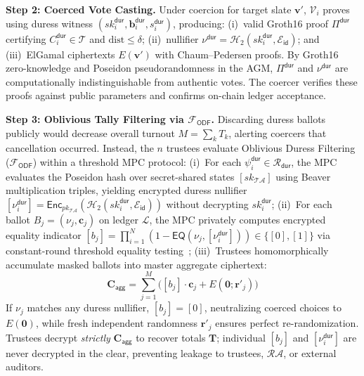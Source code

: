 \documentclass[10pt,letterpaper,journal]{IEEEtran}
\begin{document}
\textbf{Step 2: Coerced Vote Casting.} Under coercion for target slate $\mathbf{v}'$, $\mathcal{V}_i$ proves using duress witness $(sk_i^{\mathsf{dur}}, \mathbf{b}_i^{\mathsf{dur}}, s_i^{\mathsf{dur}})$, producing: (i)~valid Groth16 proof $\Pi^{\mathsf{dur}}$ certifying $C_i^{\mathsf{dur}} \in \mathcal{T}$ and $\mathrm{dist} \le \delta$; (ii)~nullifier $\nu^{\mathsf{dur}} = \mathcal{H}_2(sk_i^{\mathsf{dur}}, \mathcal{E}_{\mathsf{id}})$; and (iii)~ElGamal ciphertexts $E(\mathbf{v}')$ with Chaum--Pedersen proofs. By Groth16 zero-knowledge and Poseidon pseudorandomness in the AGM, $\Pi^{\mathsf{dur}}$ and $\nu^{\mathsf{dur}}$ are computationally indistinguishable from authentic votes. The coercer verifies these proofs against public parameters and confirms on-chain ledger acceptance.

\textbf{Step 3: Oblivious Tally Filtering via $\mathcal{F}_{\mathsf{ODF}}$.} 
Discarding duress ballots publicly would decrease overall turnout $M = \sum_k T_k$, alerting coercers that cancellation occurred. Instead, the $n$ trustees evaluate Oblivious Duress Filtering ($\mathcal{F}_{\mathsf{ODF}}$) within a threshold MPC protocol:
(i)~For each $\psi_i^{\mathsf{dur}} \in \mathcal{R}_{\mathsf{dur}}$, the MPC evaluates the Poseidon hash over secret-shared states $[sk_{\mathcal{TA}}]$ using Beaver multiplication triples, yielding encrypted duress nullifier $[\nu_i^{\mathsf{dur}}] = \mathsf{Enc}_{pk_{\mathcal{TA}}}(\mathcal{H}_2(sk_i^{\mathsf{dur}}, \mathcal{E}_{\mathsf{id}}))$ without decrypting $sk_i^{\mathsf{dur}}$;
(ii)~For each ballot $B_j = (\nu_j, \mathbf{c}_j)$ on ledger $\mathcal{L}$, the MPC privately computes encrypted equality indicator $[b_j] = \prod_{i=1}^{N} (1 - \mathsf{EQ}(\nu_j, [\nu_i^{\mathsf{dur}}])) \in \{[0], [1]\}$ via constant-round threshold equality testing~\cite{Damgard2006,Lipmaa2013};
(iii)~Trustees homomorphically accumulate masked ballots into master aggregate ciphertext:
\begin{equation}
\label{eq:duress-filtering}
\mathbf{C}_{\mathsf{agg}} = \sum_{j=1}^{M} \Big( [b_j] \cdot \mathbf{c}_j + E(\mathbf{0}; \mathbf{r}'_j) \Big)
\end{equation}
If $\nu_j$ matches any duress nullifier, $[b_j] = [0]$, neutralizing coerced choices to $E(\mathbf{0})$, while fresh independent randomness $\mathbf{r}'_j$ ensures perfect re-randomization. Trustees decrypt \emph{strictly} $\mathbf{C}_{\mathsf{agg}}$ to recover totals $\mathbf{T}$; individual $[b_j]$ and $[\nu_i^{\mathsf{dur}}]$ are never decrypted in the clear, preventing leakage to trustees, $\mathcal{RA}$, or external auditors.
\end{document}
